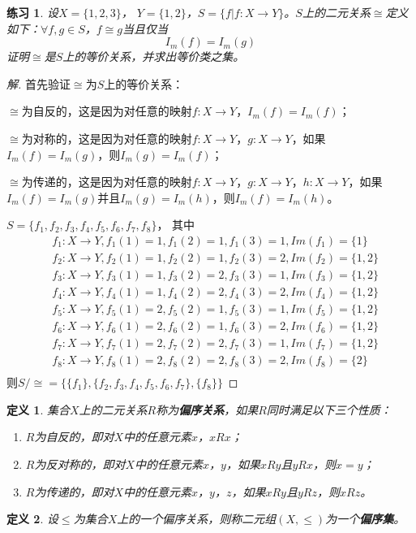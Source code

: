 \documentclass{article}
\newtheorem{Def}{定义}
\newtheorem{Exercise}{练习}
\begin{document}
\begin{CJK*}{UTF8}{gbsn}
  \begin{Exercise}
    设$X = \{1,2,3\}$， $Y = \{1,2\}$，$S = \{f|f:X \to Y\}$。$S$上的二元关系$\cong$定义如下：$\forall f,g\in S$，$f \cong g$当且仅当\[I_m(f) = I_m(g)\]证明$\cong$是$S$上的等价关系，并求出等价类之集。      
   \end{Exercise}
   \begin{proof}[解]
     首先验证$\cong$为$S$上的等价关系：
     
     $\cong$为自反的，这是因为对任意的映射$f:X\to Y$，$I_m(f)=I_m(f)$；
 
     $\cong$为对称的，这是因为对任意的映射$f:X\to Y$，$g:X\to Y$，如果$I_m(f)=I_m(g)$，则$I_m(g)=I_m(f)$；
 
     $\cong$为传递的，这是因为对任意的映射$f:X\to Y$，$g:X\to Y$，$h:X\to Y$，如果$I_m(f)=I_m(g)$并且$I_m(g)=I_m(h)$，则$I_m(f)=I_m(h)$。
     
     $S=\{f_1,f_2,f_3,f_4,f_5,f_6,f_7,f_8\}$，
     其中
     \begin{align*}
       &f_1:X\to Y, f_1(1)=1,f_1(2)=1,f_1(3) = 1, Im(f_1)=\{1\}\\
       &f_2:X\to Y, f_2(1)=1,f_2(2)=1,f_2(3) = 2, Im(f_2)=\{1,2\}\\
       &f_3:X\to Y, f_3(1)=1,f_3(2)=2,f_3(3) = 1, Im(f_3)=\{1,2\}\\
       &f_4:X\to Y, f_4(1)=1,f_4(2)=2,f_4(3) = 2, Im(f_4)=\{1,2\}\\
       &f_5:X\to Y, f_5(1)=2,f_5(2)=1,f_5(3) = 1, Im(f_5)=\{1,2\}\\
       &f_6:X\to Y, f_6(1)=2,f_6(2)=1,f_6(3) = 2, Im(f_6)=\{1,2\}\\
       &f_7:X\to Y, f_7(1)=2,f_7(2)=2,f_7(3) = 1, Im(f_7)=\{1,2\}\\
       &f_8:X\to Y, f_8(1)=2,f_8(2)=2,f_8(3) = 2, Im(f_8)=\{2\}\\
     \end{align*}
     则$S/\cong=\{\{f_1\},\{f_2,f_3,f_4,f_5,f_6,f_7\},\{f_8\}\}$
   \end{proof}
 
  \begin{Def}
    集合$X$上的二元关系$R$称为{\bfseries 偏序关系}，如果$R$同时满足以下三个性质：
    \begin{enumerate}
    \item $R$为自反的，即对$X$中的任意元素$x$，$xRx$；
    \item $R$为反对称的，即对$X$中的任意元素$x$，$y$，如果$xRy$且$yRx$，则$x=y$；
    \item $R$为传递的，即对$X$中的任意元素$x$，$y$，$z$，如果$xRy$且$yRz$，则$xRz$。
    \end{enumerate}
  \end{Def}
    \begin{Def}
    设$\leq$为集合$X$上的一个偏序关系，则称二元组$(X,\leq)$为一个{\bfseries 偏序集}。
  \end{Def}


\end{CJK*}
\end{document}
